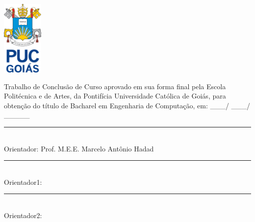 \documentclass[12pt,a4paper,oneside,brazil]{abntex2}
\begin{document}
\begin{capa}
    \center

    \OnehalfSpacing
    \ABNTEXchapterfont\bfseries\textsc{\imprimirinstituicao}

    \vfill

    \includegraphics[width=0.15\textwidth]{./src/assets/logo.png}

    \vfill

    \ABNTEXchapterfont\bfseries\imprimirtitulo

    \vfill

    \imprimirautor

    \vfill

    \bfseries\imprimirlocal

    \bfseries\imprimirdata
\end{capa}


\begin{folhaderosto}
    \centering
    \imprimirautor
    
    \vfill
    
    \ABNTEXchapterfont\bfseries\imprimirtitulo
    
    \vfill

    \justifying

    \textnormal{Trabalho de Conclusão de Curso aprovado em sua forma final pela Escola Politécnica e de
    Artes, da Pontifícia Universidade Católica de Goiás, para obtenção do título de Bacharel em
    Engenharia de Computação, em: \_\_\_/ \_\_\_/ \_\_\_\_\_}

    \centering
    
    \vspace*{3cm}
    
    \begin{flushright}
    \rule{10cm}{0.4pt}\\
    \textnormal{Orientador: Prof. M.E.E. Marcelo Antônio Hadad}

    \vspace*{10mm}

    \rule{10cm}{0.4pt}\\
    \textnormal{Orientador1:}

    \vspace*{10mm}

    \rule{10cm}{0.4pt}\\
    \textnormal{Orientador2:}
    \end{flushright}

    \vspace*{6cm}

    \bfseries\imprimirlocal

    \bfseries\imprimirdata
\end{folhaderosto}
\end{document}
